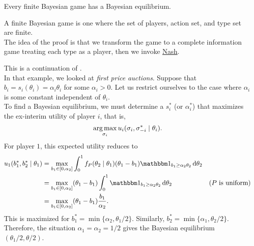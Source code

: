 	\begin{ftheo}
		Every finite Bayesian game has a Bayesian equilibrium.
	\end{ftheo}
	A finite Bayesian game is one where the set of players, action set, and type set are finite.\\
	The idea of the proof is that we transform the game to a complete information game treating each type as a player, then we invoke \hyperref[theo: msne exists]{Nash}.

	\begin{fex}
		This is a continuation of .\\
		In that example, we looked at \emph{first price auctions}. Suppose that $b_i = s_i(\theta_i) = \alpha_i\theta_i$ for some $\alpha_i > 0$. Let us restrict ourselves to the case where $\alpha_i$ is some constant independent of $\theta_i$.\\
		To find a Bayesian equilibrium, we must determine a $s_i^*$ (or $\alpha_i^*$) that maximizes the ex-interim utility of player $i$, that is,
		\[ \operatorname*{arg\,max}_{\sigma_i} u_i(\sigma_i,\sigma_{-i}^* \mid \theta_i). \]
		For player $1$, this expected utility reduces to
		\begin{align*}
			u_1(b_1^*,b_2^* \mid \theta_1) &= \max_{b_1 \in [0,\alpha_2]} \int_0^1 f_P(\theta_2 \mid \theta_1) (\theta_1 - b_1) \indic_{b_1 \ge \alpha_2 \theta_2} \dif \theta_2 \\
				&= \max_{b_1 \in [0,\alpha_2]} (\theta_1 - b_1) \int_0^1 \indic_{b_1 \ge \alpha_2 \theta_2} \dif \theta_2 & \text{($P$ is uniform)} \\
				&= \max_{b_1 \in [0,\alpha_2]} (\theta_1 - b_1)\frac{b_1}{\alpha_2}.
		\end{align*}
		This is maximized for $b_1^* = \min\{\alpha_2,\theta_1/2\}$. Similarly, $b_2^* = \min\{\alpha_1,\theta_2/2\}$.\\
		Therefore, the situation $\alpha_1 = \alpha_2 = 1/2$ gives the Bayesian equilibrium $\left( \theta_1/2 , \theta/2 \right)$.\\
	\end{fex}

